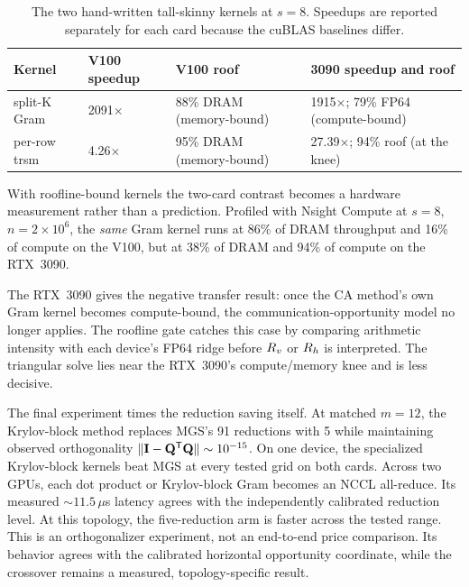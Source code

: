 \begin{table}[htbp!]
\centering
\caption{The two hand-written tall-skinny kernels at $s=8$. Speedups are reported separately for each card because the cuBLAS baselines differ.}
\label{tab:gpu-kernels}
\small
\begin{tabular}{@{}llll@{}}
\toprule
\textbf{Kernel} & \textbf{V100 speedup} & \textbf{V100 roof} & \textbf{3090 speedup and roof} \\
\midrule
split-K Gram & 2091$\times$ & 88\% DRAM (memory-bound) & 1915$\times$; 79\% FP64 (compute-bound) \\
per-row trsm & 4.26$\times$ & 95\% DRAM (memory-bound) & 27.39$\times$; 94\% roof (at the knee) \\
\bottomrule
\end{tabular}
\end{table}

With roofline-bound kernels the two-card contrast becomes a hardware measurement rather than a prediction. Profiled with Nsight Compute at $s = 8$, $n = 2 \times 10^6$, the \emph{same} Gram kernel runs at 86\% of DRAM throughput and 16\% of compute on the V100, but at 38\% of DRAM and 94\% of compute on the RTX~3090.

The RTX~3090 gives the negative transfer result: once the CA method's own Gram kernel becomes compute-bound, the communication-opportunity model no longer applies. The roofline gate catches this case by comparing arithmetic intensity with each device's FP64 ridge before $R_v$ or $R_h$ is interpreted. The triangular solve lies near the RTX~3090's compute/memory knee and is less decisive.

The final experiment times the reduction saving itself. At matched $m=12$, the Krylov-block method replaces MGS's 91 reductions with 5 while maintaining observed orthogonality $\lVert\mathbf{I}-\mathbf{Q}^{\mathsf T}\mathbf{Q}\rVert\sim10^{-15}$. On one device, the specialized Krylov-block kernels beat MGS at every tested grid on both cards. Across two GPUs, each dot product or Krylov-block Gram becomes an NCCL all-reduce. Its measured ${\sim}11.5\,\mu$s latency agrees with the independently calibrated reduction level. At this topology, the five-reduction arm is faster across the tested range. This is an orthogonalizer experiment, not an end-to-end price comparison. Its behavior agrees with the calibrated horizontal opportunity coordinate, while the crossover remains a measured, topology-specific result.
